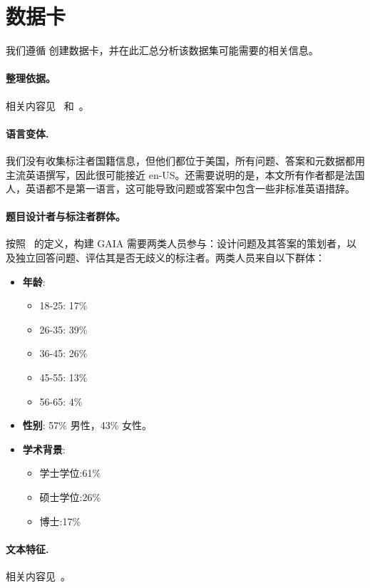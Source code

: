 \documentclass{fairmeta}
\newcommand{\benchmark}{\textsc{GAIA}}
\begin{document}
\section{数据卡}
我们遵循 \citep{bender-friedman-2018-data} 创建数据卡，并在此汇总分析该数据集可能需要的相关信息。

\paragraph{整理依据。} 相关内容见~ 和~。

\paragraph{语言变体.}
我们没有收集标注者国籍信息，但他们都位于美国，所有问题、答案和元数据都用主流英语撰写，因此很可能接近 en-US。还需要说明的是，本文所有作者都是法国人，英语都不是第一语言，这可能导致问题或答案中包含一些非标准英语措辞。

\paragraph{题目设计者与标注者群体。}
按照~\citep{bender-friedman-2018-data} 的定义，构建 \benchmark{} 需要两类人员参与：设计问题及其答案的策划者，以及独立回答问题、评估其是否无歧义的标注者。两类人员来自以下群体：
\begin{itemize}
 \item \textbf{年龄}: 
 \begin{itemize}
 \item 18-25: 17\%
 \item 26-35: 39\%
 \item 36-45: 26\%
 \item 45-55: 13\%
 \item 56-65: 4\%
 \end{itemize}
 \item \textbf{性别}: 57\% 男性，43\% 女性。
 \item \textbf{学术背景}:
 \begin{itemize}
 \item 学士学位:61\%
 \item 硕士学位:26\%
 \item 博士:17\%
 \end{itemize}
\end{itemize}

\paragraph{文本特征.} 相关内容见~。
\end{document}
